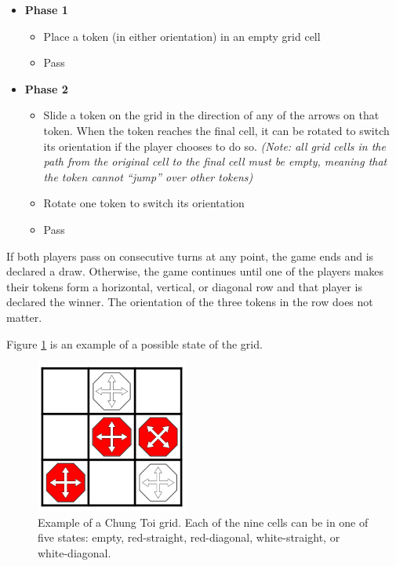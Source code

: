 \documentclass[11pt,a4paper]{report}
\begin{document}
\begin{itemize}

	\item \textbf{Phase 1}
		\begin{itemize}
			\item Place a token (in either orientation) in an empty grid cell
			\item Pass
		\end{itemize}

	\item \textbf{Phase 2}
		\begin{itemize}
			\item Slide a token on the grid in the direction of any of the arrows on that token. When the token reaches the final cell, it can be rotated to switch its orientation if the player chooses to do so. \emph{(Note: all grid cells in the path from the original cell to the final cell must be empty, meaning that the token cannot ``jump'' over other tokens)}
			\item Rotate one token to switch its orientation
			\item Pass
		\end{itemize}

\end{itemize}

If both players pass on consecutive turns at any point, the game ends and is declared a draw. Otherwise, the game continues until one of the players makes their tokens form a horizontal, vertical, or diagonal row and that player is declared the winner. The orientation of the three tokens in the row does not matter.

Figure \ref{chung-toi-grid-example} is an example of a possible state of the grid.

\begin{figure}[htbp]
	\begin{center}
		\includegraphics[width=50mm]{chung_toi_grid_example.png}
		\caption{Example of a Chung Toi grid. Each of the nine cells can be in one of five states: empty, red-straight, red-diagonal, white-straight, or white-diagonal.}
		\label{chung-toi-grid-example}
	\end{center}
\end{figure}
\end{document}
